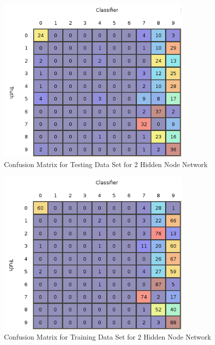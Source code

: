 \documentclass{article}
\begin{document}
\begin{figure}
\centering
\includegraphics[width=0.85\textwidth]{data/final/2_test_confusion.png}
\caption{Confusion Matrix for Testing Data Set for 2 Hidden Node Network}
\label{testconfusion2}
\end{figure}

\begin{figure}
\centering
\includegraphics[width=0.85\textwidth]{data/final/2_train_confusion.png}
\caption{Confusion Matrix for Training Data Set for 2 Hidden Node Network}
\label{trainconfusion2}
\end{figure}
\end{document}
